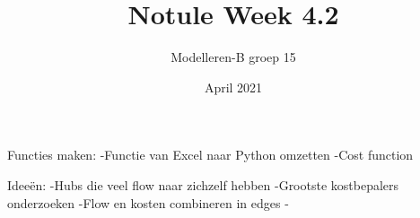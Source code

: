 \documentclass{article}
\title{Notule Week 4.2}
\author{Modelleren-B groep 15}
\date{April 2021}
\begin{document}
Functies maken:
-Functie van Excel naar Python omzetten
-Cost function

Ideeën:
-Hubs die veel flow naar zichzelf hebben
-Grootste kostbepalers onderzoeken
-Flow en kosten combineren in edges
-
\end{document}
